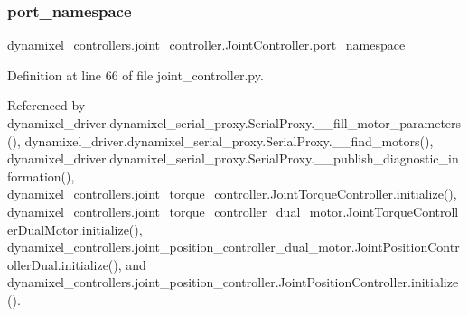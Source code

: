 \mbox{\label{classdynamixel__controllers_1_1joint__controller_1_1_joint_controller_ac89de71afa48761fb662ac2917a5b9d3}} 
\subsubsection{\texorpdfstring{port\+\_\+namespace}{port\_namespace}}
{\footnotesize\ttfamily dynamixel\+\_\+controllers.\+joint\+\_\+controller.\+Joint\+Controller.\+port\+\_\+namespace\hspace{0.3cm}{\ttfamily [inherited]}}



Definition at line 66 of file joint\+\_\+controller.\+py.



Referenced by dynamixel\+\_\+driver.\+dynamixel\+\_\+serial\+\_\+proxy.\+Serial\+Proxy.\+\_\+\+\_\+fill\+\_\+motor\+\_\+parameters(), dynamixel\+\_\+driver.\+dynamixel\+\_\+serial\+\_\+proxy.\+Serial\+Proxy.\+\_\+\+\_\+find\+\_\+motors(), dynamixel\+\_\+driver.\+dynamixel\+\_\+serial\+\_\+proxy.\+Serial\+Proxy.\+\_\+\+\_\+publish\+\_\+diagnostic\+\_\+information(), dynamixel\+\_\+controllers.\+joint\+\_\+torque\+\_\+controller.\+Joint\+Torque\+Controller.\+initialize(), dynamixel\+\_\+controllers.\+joint\+\_\+torque\+\_\+controller\+\_\+dual\+\_\+motor.\+Joint\+Torque\+Controller\+Dual\+Motor.\+initialize(), dynamixel\+\_\+controllers.\+joint\+\_\+position\+\_\+controller\+\_\+dual\+\_\+motor.\+Joint\+Position\+Controller\+Dual.\+initialize(), and dynamixel\+\_\+controllers.\+joint\+\_\+position\+\_\+controller.\+Joint\+Position\+Controller.\+initialize().

